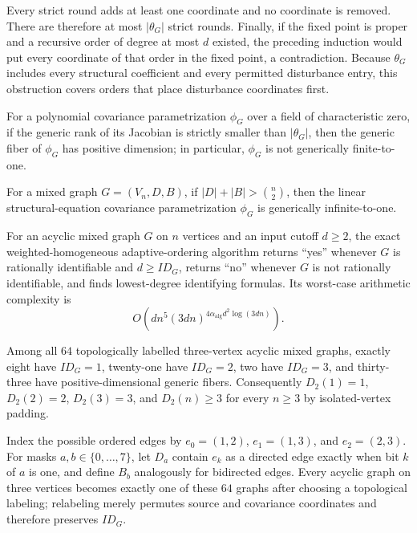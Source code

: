 Every strict round adds at least one coordinate and no coordinate is removed.  There are therefore at most \(|\theta_G|\) strict rounds.  Finally, if the fixed point is proper and a recursive order of degree at most \(d\) existed, the preceding induction would put every coordinate of that order in the fixed point, a contradiction.  Because \(\theta_G\) includes every structural coefficient and every permitted disturbance entry, this obstruction covers orders that place disturbance coordinates first.

For a polynomial covariance parametrization \(\phi_G\) over a field of characteristic zero, if the generic rank of its Jacobian is strictly smaller than \(|\theta_G|\), then the generic fiber of \(\phi_G\) has positive dimension; in particular, \(\phi_G\) is not generically finite-to-one.

For a mixed graph \(G=(V_n,D,B)\), if \(|D|+|B|>\binom n2\), then the linear structural-equation covariance parametrization \(\phi_G\) is generically infinite-to-one.

For an acyclic mixed graph \(G\) on \(n\) vertices and an input cutoff \(d\geq2\), the exact weighted-homogeneous adaptive-ordering algorithm returns ``yes'' whenever \(G\) is rationally identifiable and \(d\geq ID_G\), returns ``no'' whenever \(G\) is not rationally identifiable, and finds lowest-degree identifying formulas.  Its worst-case arithmetic complexity is
\[
 O\!\left(dn^5(3dn)^{4\alpha_{\mathrm{alg}}d^2\log(3dn)}\right).
\]

Among all \(64\) topologically labelled three-vertex acyclic mixed graphs, exactly eight have \(ID_G=1\), twenty-one have \(ID_G=2\), two have \(ID_G=3\), and thirty-three have positive-dimensional generic fibers. Consequently \(D_2(1)=1\), \(D_2(2)=2\), \(D_2(3)=3\), and \(D_2(n)\ge3\) for every \(n\ge3\) by isolated-vertex padding.

Index the possible ordered edges by \(e_0=(1,2)\), \(e_1=(1,3)\), and \(e_2=(2,3)\).  For masks \(a,b\in\{0,\ldots,7\}\), let \(D_a\) contain \(e_k\) as a directed edge exactly when bit \(k\) of \(a\) is one, and define \(B_b\) analogously for bidirected edges.  Every acyclic graph on three vertices becomes exactly one of these \(64\) graphs after choosing a topological labeling; relabeling merely permutes source and covariance coordinates and therefore preserves \(ID_G\).

